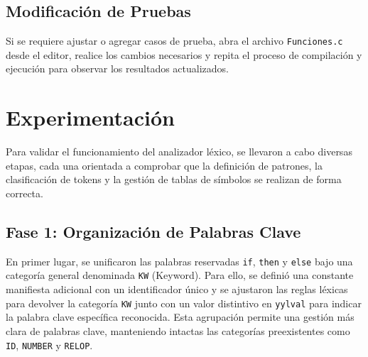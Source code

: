 \documentclass{article}
\begin{document}
\subsection{Modificación de Pruebas}

Si se requiere ajustar o agregar casos de prueba, abra el archivo \texttt{Funciones.c} desde el editor, realice los cambios necesarios y repita el proceso de compilación y ejecución para observar los resultados actualizados.




\section{Experimentación}\label{sec:exp}

Para validar el funcionamiento del analizador léxico, se llevaron a cabo diversas etapas, cada una orientada a comprobar que la definición de patrones, la clasificación de tokens y la gestión de tablas de símbolos se realizan de forma correcta.

\subsection*{Fase 1: Organización de Palabras Clave}

En primer lugar, se unificaron las palabras reservadas \texttt{if}, \texttt{then} y \texttt{else} bajo una categoría general denominada \texttt{KW} (Keyword). Para ello, se definió una constante manifiesta adicional con un identificador único y se ajustaron las reglas léxicas para devolver la categoría \texttt{KW} junto con un valor distintivo en \texttt{yylval} para indicar la palabra clave específica reconocida. Esta agrupación permite una gestión más clara de palabras clave, manteniendo intactas las categorías preexistentes como \texttt{ID}, \texttt{NUMBER} y \texttt{RELOP}.
\end{document}
